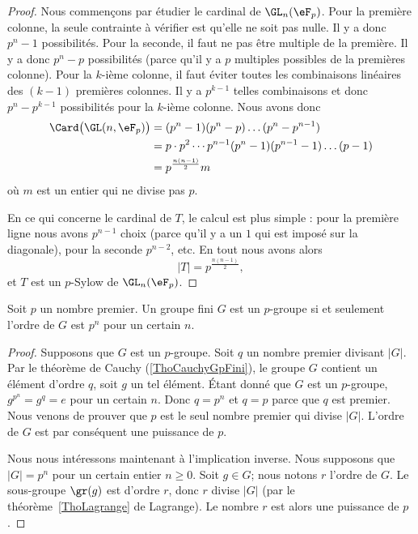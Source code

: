 \begin{proof}
	Nous commençons par étudier le cardinal de \( \GL_n(\eF_p)\). Pour la première colonne, la seule contrainte à vérifier est qu'elle ne soit pas nulle. Il y a donc \( p^n-1\) possibilités. Pour la seconde, il faut ne pas être multiple de la première. Il y a donc \( p^n-p\) possibilités (parce qu'il y a \( p\) multiples possibles de la premières colonne). Pour la \( k\)-ième colonne, il faut éviter toutes les combinaisons linéaires des \( (k-1)\) premières colonnes. Il y a \( p^{k-1}\) telles combinaisons et donc \( p^n-p^{k-1}\) possibilités pour la \( k\)-ième colonne. Nous avons donc
	\begin{subequations}
		\begin{align}
			\Card\big( \GL(n,\eF_{p}) \big) & =(p^n-1)(p^n-p)\ldots(p^n-p^{n-1})                      \\
			                                & =p\cdot p^2\cdots p^{n-1}(p^n-1)(p^{n-1}-1)\ldots (p-1) \\
			                                & =p^{\frac{ n(n-1) }{2}}m
		\end{align}
	\end{subequations}
	où \( m\) est un entier qui ne divise pas \( p\).

	En ce qui concerne le cardinal de \( T\), le calcul est plus simple : pour la première ligne nous avons \( p^{n-1}\) choix (parce qu'il y a un \( 1\) qui est imposé sur la diagonale), pour la seconde \( p^{n-2}\), etc. En tout nous avons alors
	\begin{equation}
		| T |=p^{\frac{ n(n-1) }{2}},
	\end{equation}
	et \( T\) est un \( p\)-Sylow de \( \GL_n(\eF_p)\).
\end{proof}


\begin{proposition}
	Soit \( p\) un nombre premier. Un groupe fini \( G\) est un \( p\)-groupe si et seulement l'ordre de \( G\) est \( p^n\) pour un certain \( n\).
\end{proposition}

\begin{proof}
	Supposons que \( G\) est un \( p\)-groupe. Soit \( q\) un nombre premier divisant \( | G |\). Par le théorème de Cauchy (\ref{ThoCauchyGpFini}), le groupe \( G\) contient un élément d'ordre \( q\), soit \( g\) un tel élément. Étant donné que \( G\) est un \( p\)-groupe, \( g^{p^n}=g^q=e\) pour un certain \( n\). Donc \( q=p^n\) et \( q=p\) parce que \( q\) est premier. Nous venons de prouver que \( p\) est le seul nombre premier qui divise \( | G |\). L'ordre de \( G\) est par conséquent une puissance de \( p\).

	Nous nous intéressons maintenant à l'implication inverse. Nous supposons que \( | G |=p^n\) pour un certain entier \( n\geq 0\). Soit \( g\in G\); nous notons \( r\) l'ordre de \( G\). Le sous-groupe \( \gr(g)\) est d'ordre \( r\), donc \( r\) divise \( | G |\) (par le théorème~\ref{ThoLagrange} de Lagrange). Le nombre \( r\) est alors une puissance de \( p\).
\end{proof}


